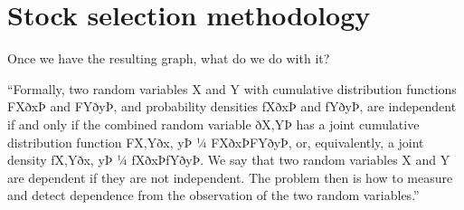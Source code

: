 \section{Stock selection methodology}
\label{sec:usage:stockselection}

Once we have the resulting graph, what do we do with it?

``Formally, two random variables X and Y with
cumulative distribution functions FXðxÞ and FYðyÞ,
and probability densities fXðxÞ and fYðyÞ, are independent
if and only if the combined random variable
ðX,YÞ has a joint cumulative distribution function
FX,Yðx, yÞ ¼ FXðxÞFYðyÞ, or, equivalently, a joint
density fX,Yðx, yÞ ¼ fXðxÞfYðyÞ. We say that two
random variables X and Y are dependent if they
are not independent. The problem then is how to
measure and detect dependence from the observation
of the two random variables.''\cite{santos2013}